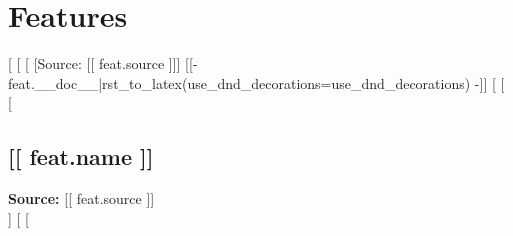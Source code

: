 \section*{Features}
[%
[%
  [%
    [Source: [[ feat.source ]]]
    [[- feat.__doc__|rst_to_latex(use_dnd_decorations=use_dnd_decorations) -]]
  [%
[%
  [%
    \subsection*{[[ feat.name ]]}
    \textbf{Source:} [[ feat.source ]] \\
    [%
      \textbf{**Not included in stats on Character Sheet}
    [%
    [[- feat.__doc__|rst_to_latex -]]
  [%
[%
